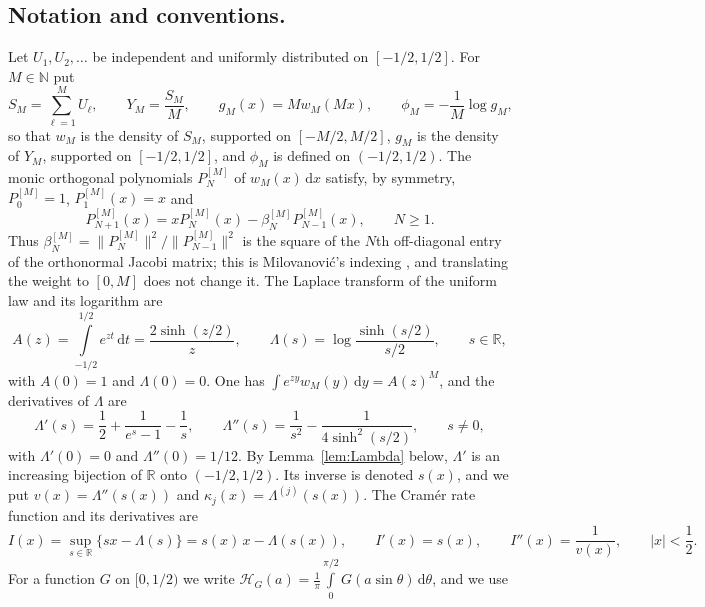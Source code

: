 \documentclass{math}
\let\TJMoriginalint\int
\renewcommand{\int}{\TJMoriginalint\limits}
\newcommand{\R}{\mathbb R}
\newcommand{\N}{\mathbb N}
\newcommand{\dd}{\,\mathrm d}
\begin{document}
\subsection{Notation and conventions.}\label{subsec:notation}
Let $U_1,U_2,\ldots$ be independent and uniformly distributed on $[-1/2,1/2]$. For $M\in\N$ put
\begin{equation}\label{eq:SM}
S_M=\sum_{\ell=1}^MU_\ell,\qquad Y_M=\frac{S_M}{M},\qquad g_M(x)=Mw_M(Mx),\qquad \phi_M=-\frac1M\log g_M ,
\end{equation}
so that $w_M$ is the density of $S_M$, supported on $[-M/2,M/2]$, $g_M$ is the density of $Y_M$, supported on $[-1/2,1/2]$, and $\phi_M$ is defined on $(-1/2,1/2)$. The monic orthogonal polynomials $P_N^{[M]}$ of $w_M(x)\dd x$ satisfy, by symmetry, $P_0^{[M]}=1$, $P_1^{[M]}(x)=x$ and
\begin{equation}\label{eq:recurrence}
P_{N+1}^{[M]}(x)=xP_N^{[M]}(x)-\beta_N^{[M]}P_{N-1}^{[M]}(x),\qquad N\ge1 .
\end{equation}
Thus $\beta_N^{[M]}=\|P_N^{[M]}\|^2/\|P_{N-1}^{[M]}\|^2$ is the square of the $N$th off-diagonal entry of the orthonormal Jacobi matrix; this is Milovanovi\'c's indexing \cite[(2)--(3)]{milovanovic2017}, and translating the weight to $[0,M]$ does not change it. The Laplace transform of the uniform law and its logarithm are
\begin{equation}\label{eq:Lambda}
A(z)=\int_{-1/2}^{1/2}e^{zt}\dd t=\frac{2\sinh(z/2)}{z},\qquad \Lambda(s)=\log\frac{\sinh(s/2)}{s/2},\qquad s\in\R ,
\end{equation}
with $A(0)=1$ and $\Lambda(0)=0$. One has $\int e^{zy}w_M(y)\dd y=A(z)^M$, and the derivatives of $\Lambda$ are
\begin{equation}\label{eq:Lambdaprime}
\Lambda'(s)=\frac12+\frac1{e^s-1}-\frac1s,\qquad \Lambda''(s)=\frac1{s^2}-\frac1{4\sinh^2(s/2)},\qquad s\ne0 ,
\end{equation}
with $\Lambda'(0)=0$ and $\Lambda''(0)=1/12$. By Lemma~\ref{lem:Lambda} below, $\Lambda'$ is an increasing bijection of $\R$ onto $(-1/2,1/2)$. Its inverse is denoted $s(x)$, and we put $v(x)=\Lambda''(s(x))$ and $\kappa_j(x)=\Lambda^{(j)}(s(x))$. The Cram\'er rate function and its derivatives are
\begin{equation}\label{eq:I}
I(x)=\sup_{s\in\R}\{sx-\Lambda(s)\}=s(x)\,x-\Lambda(s(x)),\qquad I'(x)=s(x),\qquad I''(x)=\frac1{v(x)},\qquad |x|<\frac12 .
\end{equation}
For a function $G$ on $[0,1/2)$ we write $\mathcal H_G(a)=\frac1\pi\int_0^{\pi/2}G(a\sin\theta)\dd\theta$, and we use
\end{document}
